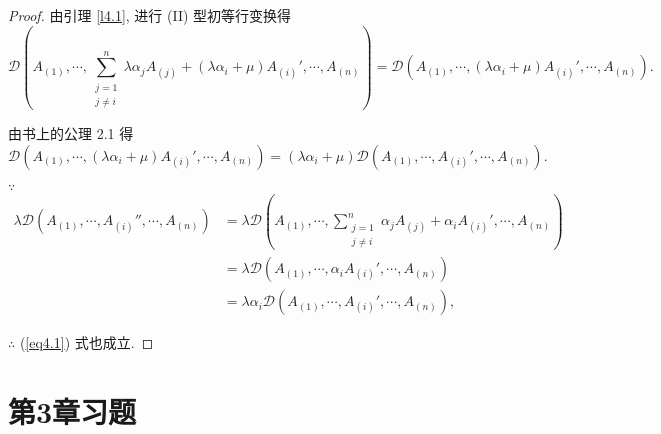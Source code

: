 \documentclass{ctexart}
\begin{document}
\begin{proof}
    由引理 \ref{l4.1}, 进行 (II) 型初等行变换得
    \[\mathcal{D}\left(A_{(1)},\cdots,\sum\limits_{\substack{j=1\\j\neq i}}^{n}\lambda\alpha_jA_{(j)}+(\lambda\alpha_i+\mu)A_{(i)}',\cdots,A_{(n)}\right)=\mathcal{D}\left(A_{(1)},\cdots,(\lambda\alpha_i+\mu)A_{(i)}',\cdots,A_{(n)}\right).\]

    由书上的公理 2.1 得
    \[\mathcal{D}\left(A_{(1)},\cdots,(\lambda\alpha_i+\mu)A_{(i)}',\cdots,A_{(n)}\right)=(\lambda\alpha_i+\mu)\mathcal{D}\left(A_{(1)},\cdots,A_{(i)}',\cdots,A_{(n)}\right).\]

    $\because$
    \begin{align*}
        \lambda\mathcal{D}(A_{(1)},\cdots,A_{(i)}'',\cdots,A_{(n)}) & =\lambda\mathcal{D}\left(A_{(1)},\cdots,\sum\limits_{\substack{j=1\\j\neq i}}^{n}\alpha_jA_{(j)}+\alpha_iA_{(i)}',\cdots,A_{(n)}\right) \\
        & =\lambda\mathcal{D}\left(A_{(1)},\cdots,\alpha_iA_{(i)}',\cdots,A_{(n)}\right) \\
        & =\lambda\alpha_i\mathcal{D}\left(A_{(1)},\cdots,A_{(i)}',\cdots,A_{(n)}\right),
    \end{align*}

    $\therefore$ (\ref{eq4.1}) 式也成立.
\end{proof}
\section{第3章习题}
\end{document}
